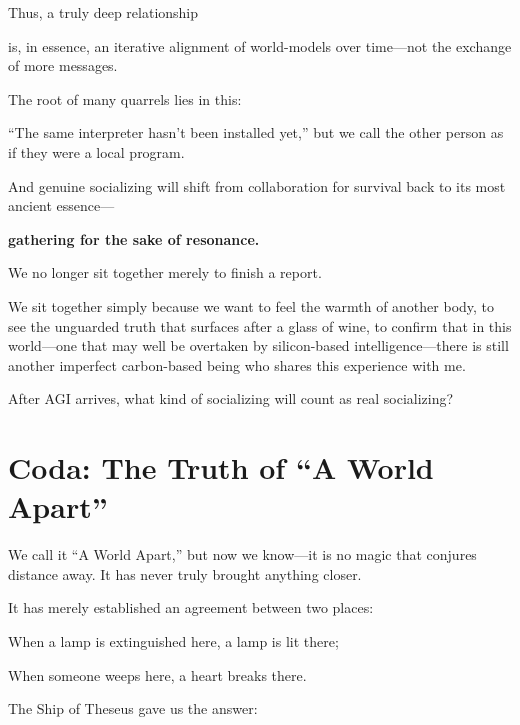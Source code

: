 \vspace{1em}

Thus, a truly deep relationship

is, in essence, an iterative alignment of world-models over time---not the exchange of more messages.

The root of many quarrels lies in this:

``The same interpreter hasn't been installed yet,'' but we call the other person as if they were a local program.

\vspace{1em}

And genuine socializing will shift from collaboration for survival back to its most ancient essence---

\textbf{gathering for the sake of resonance.}

\vspace{1em}

We no longer sit together merely to finish a report.

We sit together simply because we want to feel the warmth of another body, to see the unguarded truth that surfaces after a glass of wine, to confirm that in this world---one that may well be overtaken by silicon-based intelligence---there is still another imperfect carbon-based being who shares this experience with me.

\begin{thinkbox}
After AGI arrives, what kind of socializing will count as real socializing?
\end{thinkbox}

\newpage
\section{Coda: The Truth of ``A World Apart''}

We call it ``A World Apart,'' but now we know---it is no magic that conjures distance away. It has never truly brought anything closer.

\vspace{1em}

It has merely established an agreement between two places:

When a lamp is extinguished here, a lamp is lit there;

When someone weeps here, a heart breaks there.

\vspace{1em}

The Ship of Theseus gave us the answer:


